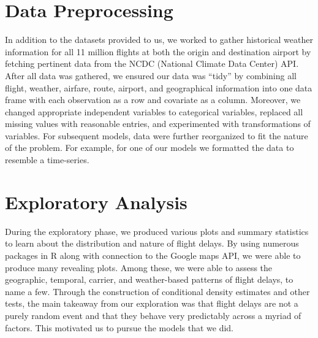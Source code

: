 \documentclass[12pt, a4paper, openany]{book}
\newcommand\tab[1][1cm]{\hspace*{#1}}
\begin{document}
	\section{Data Preprocessing}
\tab In addition to the datasets provided to us, we worked to gather historical weather information for all 11 million flights at both the origin and destination airport by fetching pertinent data from the NCDC (National Climate Data Center) API. After all data was gathered, we ensured our data was “tidy” by combining all flight, weather, airfare, route, airport, and geographical information into one data frame with each observation as a row and covariate as a column. Moreover, we changed appropriate independent variables to categorical variables, replaced all missing values with reasonable entries, and experimented with transformations of variables. For subsequent models, data were further reorganized to fit the nature of the problem. For example, for one of our models we formatted the data to resemble a time-series. 
	\section{Exploratory Analysis}
\tab During the exploratory phase, we produced various plots and summary statistics to learn about the distribution and nature of flight delays. By using numerous packages in R along with connection to the Google maps API, we were able to produce many revealing plots. Among these, we were able to assess the geographic, temporal, carrier, and weather-based patterns of flight delays, to name a few. Through the construction of conditional density estimates and other tests, the main takeaway from our exploration was that flight delays are not a purely random event and that they behave very predictably across a myriad of factors. This motivated us to pursue the models that we did. 
\end{document}
